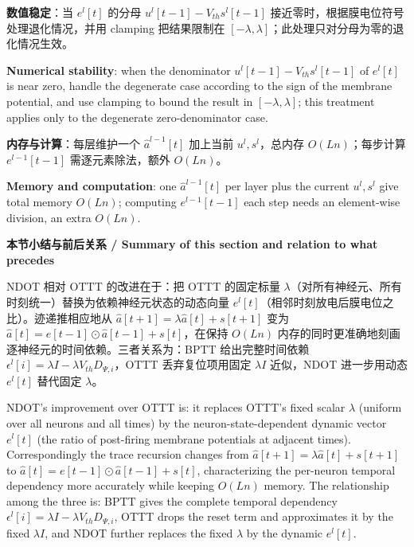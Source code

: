 \documentclass[journal,12pt,onecolumn]{IEEEtran}
\begin{document}
\textbf{数值稳定}：当 $e^l[t]$ 的分母 $u^l[t-1]-V_{th}s^l[t-1]$ 接近零时，根据膜电位符号处理退化情况，并用 clamping 把结果限制在 $[-\lambda,\lambda]$；此处理只对分母为零的退化情况生效。

\textbf{Numerical stability}: when the denominator $u^l[t-1]-V_{th}s^l[t-1]$ of $e^l[t]$ is near zero, handle the degenerate case according to the sign of the membrane potential, and use clamping to bound the result in $[-\lambda,\lambda]$; this treatment applies only to the degenerate zero-denominator case.

\textbf{内存与计算}：每层维护一个 $\hat{a}^{l-1}[t]$ 加上当前 $u^l,s^l$，总内存 $O(Ln)$；每步计算 $e^{l-1}[t-1]$ 需逐元素除法，额外 $O(Ln)$。

\textbf{Memory and computation}: one $\hat{a}^{l-1}[t]$ per layer plus the current $u^l,s^l$ give total memory $O(Ln)$; computing $e^{l-1}[t-1]$ each step needs an element-wise division, an extra $O(Ln)$.

\medskip\noindent\textbf{本节小结与前后关系 / Summary of this section and relation to what precedes}

NDOT 相对 OTTT 的改进在于：把 OTTT 的固定标量 $\lambda$（对所有神经元、所有时刻统一）替换为依赖神经元状态的动态向量 $e^l[t]$（相邻时刻放电后膜电位之比）。迹递推相应地从 $\hat{a}[t+1]=\lambda\hat{a}[t]+s[t+1]$ 变为 $\hat{a}[t]=e[t-1]\odot\hat{a}[t-1]+s[t]$，在保持 $O(Ln)$ 内存的同时更准确地刻画逐神经元的时间依赖。三者关系为：BPTT 给出完整时间依赖 $\epsilon^l[i]=\lambda I-\lambda V_{th}D_{\Psi,i}$，OTTT 丢弃复位项用固定 $\lambda I$ 近似，NDOT 进一步用动态 $e^l[t]$ 替代固定 $\lambda$。

NDOT's improvement over OTTT is: it replaces OTTT's fixed scalar $\lambda$ (uniform over all neurons and all times) by the neuron-state-dependent dynamic vector $e^l[t]$ (the ratio of post-firing membrane potentials at adjacent times). Correspondingly the trace recursion changes from $\hat{a}[t+1]=\lambda\hat{a}[t]+s[t+1]$ to $\hat{a}[t]=e[t-1]\odot\hat{a}[t-1]+s[t]$, characterizing the per-neuron temporal dependency more accurately while keeping $O(Ln)$ memory. The relationship among the three is: BPTT gives the complete temporal dependency $\epsilon^l[i]=\lambda I-\lambda V_{th}D_{\Psi,i}$, OTTT drops the reset term and approximates it by the fixed $\lambda I$, and NDOT further replaces the fixed $\lambda$ by the dynamic $e^l[t]$.


\end{document}
